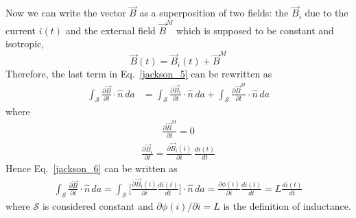 \documentclass[11pt,a4paper,oneside]{book}
\numberwithin{equation}{section}
\theoremstyle{it}
\theoremstyle{definition}
\begin{document}
Now we can write the vector $\vec{B}$ as a superposition of two fields:  the 
$\vec{B}_i$ due to the current $i(t)$ and the external field $\vec{B}^M$ which 
is supposed to be constant and isotropic, 
\begin{equation*}
	\vec{B}(t)=\vec{B}_i(t)+\vec{B}^M
\end{equation*}
Therefore, the last term in Eq.~\ref{jackson_5} can be rewritten as
\begin{equation}\label{jackson_6}
	\begin{aligned}
		\int_\mathcal{S}\frac{\partial\vec{B}}{\partial t}\cdot\hat{n}\,da &= 
		\int_\mathcal{S}\frac{\partial \vec{B}_i}{\partial t}\cdot\hat{n}\, da 
		+ \int_\mathcal{S}\frac{\partial \vec{B}^M}{\partial t}\cdot\hat{n}\, da
	\end{aligned}
\end{equation} 
where 
\begin{equation}\label{jackson_6b}
	\begin{aligned}
		\frac{\partial \vec{B}^M}{\partial t} = 0
	\end{aligned}
\end{equation} 
\begin{equation}\label{jackson_6c}
	\begin{aligned}
		\frac{\partial \vec{B}_i}{\partial t} = \frac{\partial 
		\vec{B}_i(i)}{\partial i}\,\frac{d i(t)}{dt}
	\end{aligned}
\end{equation} 
Hence Eq.~\ref{jackson_6} can be written as
\begin{equation}\label{jackson_6d}
	\begin{aligned}
		\int_\mathcal{S}\frac{\partial\vec{B}}{\partial t}\cdot\hat{n}\,da = 
		\int_\mathcal{S}\Big[\frac{\partial \vec{B}_i(i)}{\partial i}\frac{d 
		i(t)}{dt}\Big]\cdot\hat{n}\,da = \frac{\partial \phi(i)}{\partial i} 
		\frac{di(t)}{dt} = L\frac{di(t)}{dt}
	\end{aligned}
\end{equation} 
where $\mathcal{S}$ is considered constant and $\partial \phi(i)/\partial i = 
L$ is the definition of inductance.
\end{document}
